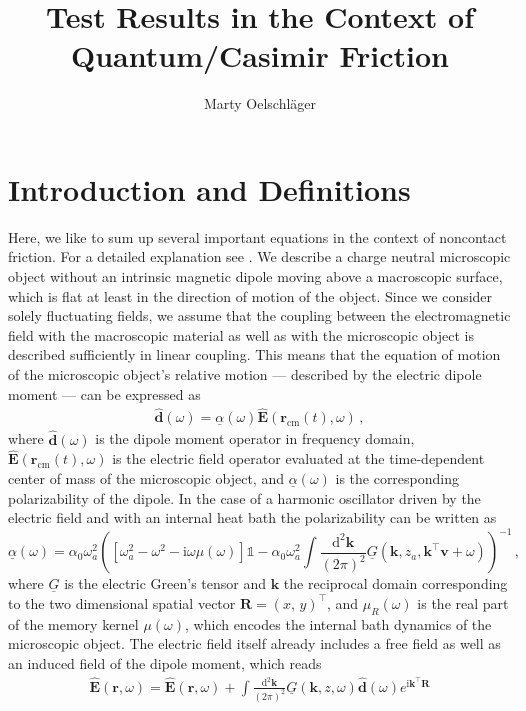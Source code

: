 \documentclass[11pt]{article}
\title{Test Results in the Context of Quantum/Casimir Friction}
\author{Marty Oelschläger}
\newcommand{\vv}[1]{\mathbf{#1}}
\newcommand{\ii}[0]{\mathrm{i}}
\newcommand{\dd}[0]{\mathrm{d}}
\begin{document}
\maketitle
\section{Introduction and Definitions}
Here, we like to sum up several important equations in the context of noncontact friction. For a detailed explanation see \cite{oelschlager2019a}. We describe a charge neutral microscopic object without an intrinsic magnetic dipole moving above a macroscopic surface, which is flat at least in the direction of motion of the object. Since we consider solely fluctuating fields, we assume that the coupling between the electromagnetic field with the macroscopic material as well as with the microscopic object is described sufficiently in linear coupling. This means that the equation of motion of the microscopic object's relative motion --- described by the electric dipole moment --- can be expressed as
\begin{align}
  \hat{\vv{d}}(\omega) = \underline{\alpha}(\omega) \hat{\vv{E}}(\vv r_\mathrm{cm}(t),\omega)\,,
\end{align}
where $\hat{\vv{d}}(\omega)$ is the dipole moment operator in frequency domain, $\hat{\vv{E}}(\vv r_\mathrm{cm}(t),\omega)$ is the electric field operator evaluated at the time-dependent center of mass of the microscopic object, and $\underline{\alpha}(\omega)$ is the corresponding polarizability of the dipole. In the case of a harmonic oscillator driven by the electric field and with an internal heat bath the polarizability can be written as
\begin{equation}
\underline{\alpha}(\omega)=
\alpha_0\omega_a^2 \left(
  \left[
  \omega_a^2 - \omega^2 -\ii\omega\mu(\omega)\right]\mathbb{1}
- \alpha_0\omega_a^2\int\frac{\mathrm{d}^2\mathbf{k}}{(2\pi)^2} \underline{G}(\mathbf{k},z_a,\mathbf{k}^\intercal \mathbf{v} + \omega)
\right)^{-1}\,,
\end{equation}
where $\underline{G}$ is the electric Green's tensor and $\vv k$ the reciprocal domain corresponding to the two dimensional spatial vector $\vv R=(x,\, y)^\intercal$, and $\mu_R(\omega)$ is the real part of the memory kernel $\mu(\omega)$, which encodes the internal bath dynamics of the microscopic object.
The electric field itself already includes a free field as well as an induced field of the dipole moment, which reads
\begin{align}
  \hat{\vv{E}}(\vv r,\omega) = \hat{\vv{E}}(\vv r,\omega) + \int\frac{\dd^2\vv k}{(2\pi)^2} \underline{G}(\vv k,z,\omega)\hat{\vv{d}}(\omega)e^{\ii\vv k^\intercal \vv R}
\end{align}
\end{document}
